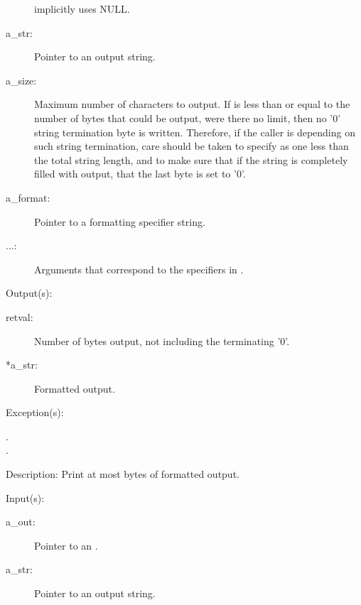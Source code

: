 \begin{capi}
\begin{capilist}
\begin{description}
			 implicitly uses NULL.
		\item[a\_str: ]
			Pointer to an output string.
		\item[a\_size: ]
			Maximum number of characters to output.  If
			 is less than or equal to the number of
			bytes that could be output, were there no limit, then no
			'{\bs}0' string termination byte is written.  Therefore,
			if the caller is depending on such string termination,
			care should be taken to specify  as one
			less than the total string length, and to make sure that
			if the string is completely filled with output, that the
			last byte is set to '{\bs}0'.
		\item[a\_format: ]
			Pointer to a formatting specifier string.
		\item[...: ]
			Arguments that correspond to the specifiers in
			.
		\end{description}
	\item[Output(s): ]
		\begin{description}\item[]
		\item[retval: ]
			Number of bytes output, not including the terminating
			'{\bs}0'.
		\item[*a\_str: ]
			Formatted output.
		\end{description}
	\item[Exception(s): ]
		\begin{description}\item[]
		\item[.]
		\item[.]
		\end{description}
	\item[Description: ]
		Print at most  bytes of formatted output.
	\end{capilist}
\label{out_put_sv}
	\begin{capilist}
	\item[Input(s): ]
		\begin{description}\item[]
		\item[a\_out: ]
			Pointer to an .
		\item[a\_str: ]
			Pointer to an output string.

\end{description}
\end{capilist}
\end{capi}
